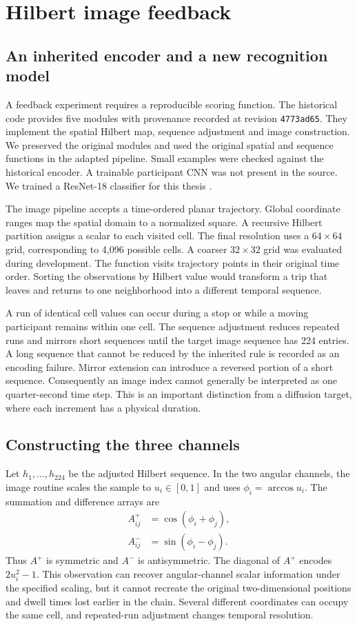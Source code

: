 \chapter{Hilbert image feedback}
\label{ch:gaf}
\section{An inherited encoder and a new recognition model}
A feedback experiment requires a reproducible scoring function. The historical code provides five modules with provenance recorded at revision \texttt{4773ad65}. They implement the spatial Hilbert map, sequence adjustment and image construction. We preserved the original modules and used the original spatial and sequence functions in the adapted pipeline. Small examples were checked against the historical encoder. A trainable participant CNN was not present in the source. We trained a ResNet-18 classifier for this thesis \cite{resnet}.

The image pipeline accepts a time-ordered planar trajectory. Global coordinate ranges map the spatial domain to a normalized square. A recursive Hilbert partition assigns a scalar to each visited cell. The final resolution uses a $64\times64$ grid, corresponding to 4,096 possible cells. A coarser $32\times32$ grid was evaluated during development. The function visits trajectory points in their original time order. Sorting the observations by Hilbert value would transform a trip that leaves and returns to one neighborhood into a different temporal sequence.

A run of identical cell values can occur during a stop or while a moving participant remains within one cell. The sequence adjustment reduces repeated runs and mirrors short sequences until the target image sequence has 224 entries. A long sequence that cannot be reduced by the inherited rule is recorded as an encoding failure. Mirror extension can introduce a reversed portion of a short sequence. Consequently an image index cannot generally be interpreted as one quarter-second time step. This is an important distinction from a diffusion target, where each increment has a physical duration.

\section{Constructing the three channels}
Let $h_1,\dots,h_{224}$ be the adjusted Hilbert sequence. In the two angular channels, the image routine scales the sample to $u_i\in[0,1]$ and uses $\phi_i=\arccos u_i$. The summation and difference arrays are
\begin{align}
 A^+_{ij}&=\cos(\phi_i+\phi_j),\\
 A^-_{ij}&=\sin(\phi_i-\phi_j).
\end{align}
Thus $A^+$ is symmetric and $A^-$ is antisymmetric. The diagonal of $A^+$ encodes $2u_i^2-1$. This observation can recover angular-channel scalar information under the specified scaling, but it cannot recreate the original two-dimensional positions and dwell times lost earlier in the chain. Several different coordinates can occupy the same cell, and repeated-run adjustment changes temporal resolution.

